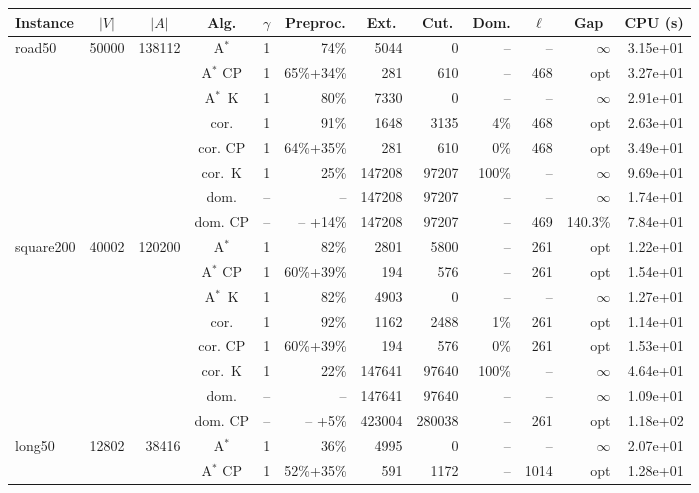 \documentclass[11pt]{amsart}
\newenvironment{outdent}
{\begin{list}{}{\leftmargin-2cm\rightmargin\leftmargin}\centering\item\relax}
{\end{list}\ignorespacesafterend}
\theoremstyle{plain}
\theoremstyle{remark}
\begin{document}
\begin{table}
\begin{outdent}
\begin{small}
\begin{tabular}{|l|rrc|rr|rrr|rr|r|}
\hline
Instance 
& \multicolumn{1}{c}{$|V|$} 
& \multicolumn{1}{c}{$|A|$} 
& \multicolumn{1}{c|}{Alg.} 
& \multicolumn{1}{c}{$\gamma$} 
& \multicolumn{1}{c|}{Preproc.} 
& \multicolumn{1}{c}{Ext.} 
& \multicolumn{1}{c}{Cut.} 
& \multicolumn{1}{c|}{Dom.} 
& \multicolumn{1}{c}{$\ell$} 
& \multicolumn{1}{c|}{Gap} 
& \multicolumn{1}{c|}{CPU (s)} \\
\hline
road50 & 50000 & 138112 & A$^*$ & 1 & 74\% &5044 & 0 & -- & -- &$\infty$ & 3.15e+01 \\
&&&A$^*$ CP & 1 & 65\%+34\% &281 & 610 & -- &468 & opt & 3.27e+01 \\
&&&A$^*$~K & 1 & 80\% &7330 & 0 & -- & -- &$\infty$ & 2.91e+01 \\
&&&cor. & 1 & 91\% &1648 & 3135 & 4\% &468 & opt & 2.63e+01 \\
&&&cor. CP & 1 & 64\%+35\% &281 & 610 & 0\% &468 & opt & 3.49e+01 \\
&&&cor.~K & 1 & 25\% &147208 & 97207 & 100\% & -- &$\infty$ & 9.69e+01 \\
&&&dom. & -- & --  &147208 & 97207 & -- & -- &$\infty$ & 1.74e+01 \\
&&&dom. CP & -- & -- +14\% &147208 & 97207 & -- &469 & 140.3\% & 7.84e+01 \\
\hline
square200 & 40002 & 120200 & A$^*$ & 1 & 82\% &2801 & 5800 & -- &261 & opt & 1.22e+01 \\
&&&A$^*$ CP & 1 & 60\%+39\% &194 & 576 & -- &261 & opt & 1.54e+01 \\
&&&A$^*$~K & 1 & 82\% &4903 & 0 & -- & -- &$\infty$ & 1.27e+01 \\
&&&cor. & 1 & 92\% &1162 & 2488 & 1\% &261 & opt & 1.14e+01 \\
&&&cor. CP & 1 & 60\%+39\% &194 & 576 & 0\% &261 & opt & 1.53e+01 \\
&&&cor.~K & 1 & 22\% &147641 & 97640 & 100\% & -- &$\infty$ & 4.64e+01 \\
&&&dom. & -- & --  &147641 & 97640 & -- & -- &$\infty$ & 1.09e+01 \\
&&&dom. CP & -- & -- +5\% &423004 & 280038 & -- &261 & opt & 1.18e+02 \\
\hline
long50 & 12802 & 38416 & A$^*$ & 1 & 36\% &4995 & 0 & -- & -- &$\infty$ & 2.07e+01 \\
&&&A$^*$ CP & 1 & 52\%+35\% &591 & 1172 & -- &1014 & opt & 1.28e+01 \\

\end{tabular}
\end{small}
\end{outdent}
\end{table}
\end{document}
